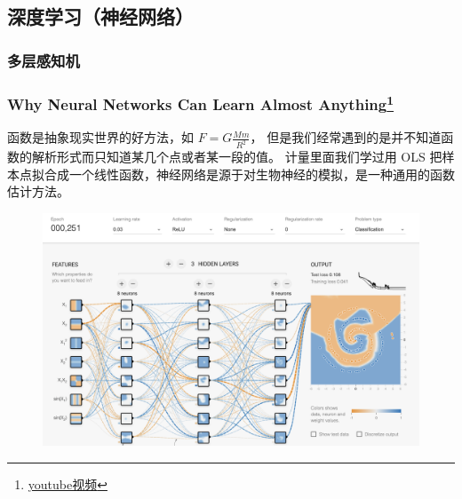\subsection{深度学习（神经网络）}
\subsubsection{多层感知机}
\begin{frame}
    \frametitle{Why Neural Networks Can Learn Almost Anything\footnote{\href{https://www.youtube.com/watch?v=0QczhVg5HaI}{youtube视频}}}
    函数是抽象现实世界的好方法，如 \(\displaystyle F=G\frac{Mm}{R^2}\)，
    但是我们经常遇到的是并不知道函数的解析形式而只知道某几个点或者某一段的值。
    计量里面我们学过用 OLS 把样本点拟合成一个线性函数，神经网络是源于对生物神经的模拟，是一种通用的函数估计方法\cite{hornik1989multilayer}。
    \begin{figure}[hb]
        \href{https://playground.tensorflow.org/}{\includegraphics[width=0.7\linewidth]{../lib/tfplay.png}}
    \end{figure}
\end{frame}
